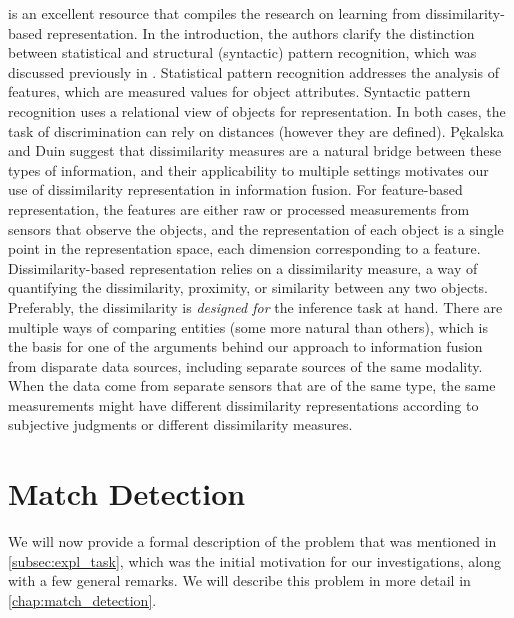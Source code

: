 \documentclass[12pt,oneside,final]{thesis}\usepackage[]{graphicx}\usepackage[]{color}
\begin{document}
 \cite{duin2005dissimilarity} is an excellent resource that compiles the research on learning from dissimilarity-based representation. In the introduction, the authors clarify the distinction between statistical and structural (syntactic) pattern recognition, which was discussed previously in \cite{NadlerSmith1993}. Statistical pattern recognition  addresses the analysis of features, which are  measured values for object attributes. Syntactic pattern recognition uses a relational view of objects for representation. In both cases,  the task of discrimination  can rely on distances (however they are defined). P{\k{e}}kalska and Duin  suggest that dissimilarity measures  are a natural bridge between these types of information, and their applicability to multiple settings motivates our use of dissimilarity representation in information fusion. 
For feature-based representation, the features are either raw or processed measurements from sensors that observe the objects, and the representation of each object is a single point in the representation space, each dimension corresponding to a feature. Dissimilarity-based representation relies on a dissimilarity measure, a way of quantifying the dissimilarity, proximity, or similarity between any two objects. Preferably, the dissimilarity is \emph{designed for} the inference task at hand. 
There are multiple ways of comparing entities (some more natural than others), which is the basis for one of the arguments behind our approach to information fusion from disparate data sources, including separate sources of the same modality. When the data come from separate sensors that are of the same type, the same measurements might have different dissimilarity representations according to subjective judgments or different dissimilarity measures. 

\section{Match Detection}

We will now provide a formal description of the problem that was mentioned in \autoref{subsec:expl_task}, which was the initial motivation for our investigations, along with a few general remarks.  We will describe this problem in more detail in \autoref{chap:match_detection}.
\end{document}

